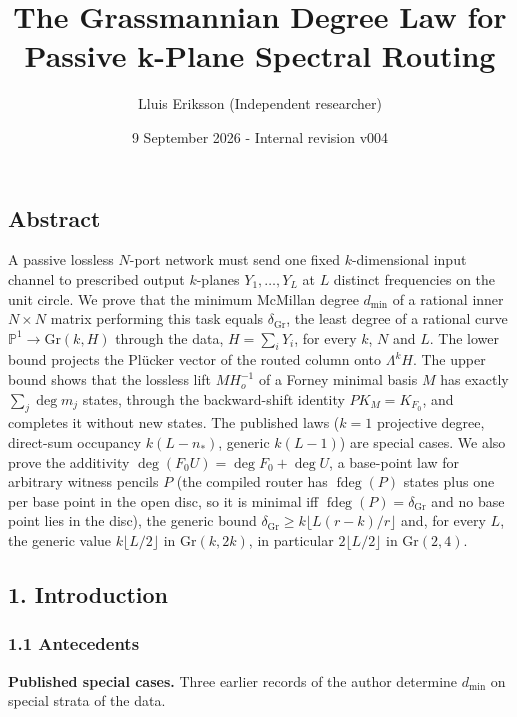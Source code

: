 \documentclass[
  11pt,
  a4paper,
]{article}
\title{The Grassmannian Degree Law for Passive k-Plane Spectral Routing}
\author{Lluis Eriksson (Independent researcher)}
\date{9 September 2026 - Internal revision v004}
\begin{document}
\maketitle

\subsection{Abstract}\label{abstract}

A passive lossless \(N\)-port network must send one fixed
\(k\)-dimensional input channel to prescribed output \(k\)-planes
\(Y_1,\allowbreak{}\dots,\allowbreak{}Y_L\) at \(L\) distinct frequencies on the unit circle. We
prove that the minimum McMillan degree \(d_{\min}\) of a rational inner
\(N\times N\) matrix performing this task equals
\(\delta_{\mathrm{Gr}}\), the least degree of a rational curve
\(\mathbb P^1\to\mathrm{Gr}(k,\allowbreak{}H)\) through the data, \(H=\sum_iY_i\),
for every \(k\), \(N\) and \(L\). The lower bound projects the Plücker
vector of the routed column onto \(\Lambda^kH\). The upper bound shows
that the lossless lift \(MH_o^{-1}\) of a Forney minimal basis \(M\) has
exactly \(\sum_j\deg m_j\) states, through the backward-shift identity
\(PK_M=K_{F_0}\), and completes it without new states. The published
laws (\(k=1\) projective degree, direct-sum occupancy \(k(L-n_*)\),
generic \(k(L-1)\)) are special cases. We also prove the additivity
\(\deg(F_0U)=\deg F_0+\deg U\), a base-point law for arbitrary witness
pencils \(P\) (the compiled router has \(\operatorname{fdeg}(P)\) states
plus one per base point in the open disc, so it is minimal iff
\(\operatorname{fdeg}(P)=\delta_{\mathrm{Gr}}\) and no base point lies
in the disc), the generic bound
\(\delta_{\mathrm{Gr}}\ge k\lfloor L(r-k)/r\rfloor\) and, for every
\(L\), the generic value \(k\lfloor L/2\rfloor\) in
\(\mathrm{Gr}(k,\allowbreak{}2k)\), in particular \(2\lfloor L/2\rfloor\) in
\(\mathrm{Gr}(2,\allowbreak{}4)\).

\subsection{1. Introduction}\label{introduction}

\subsubsection{1.1 Antecedents}\label{antecedents}

\textbf{Published special cases.} Three earlier records of the author
determine \(d_{\min}\) on special strata of the data.
\end{document}
